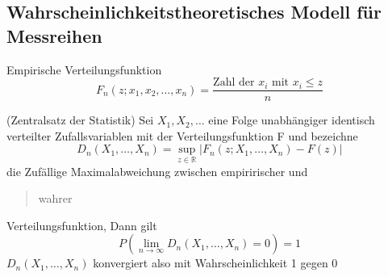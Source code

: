 \documentclass[
	ngerman,
	accentcolor=9c,%
	type=intern,
	marginpar=false
	]{tudapub}
\begin{document}
                \subsection*{Wahrscheinlichkeitstheoretisches Modell für Messreihen}
                Empirische Verteilungsfunktion
                \begin{equation*}
                    F_n(z; x_1,x_2,\dots,x_n) = \dfrac{\text{Zahl der }x_i\text{ mit }x_i\leq z}{n}
                \end{equation*}
                \setcounter{satz}{3}
                \begin{satz}
                    (Zentralsatz der Statistik) Sei $X_1,X_2,\dots$ eine Folge unabhängiger identisch verteilter Zufallsvariablen mit der Verteilungsfunktion F und bezeichne
                    \begin{equation*}
                        D_n(X_1,\dots,X_n) = \sup_{z \in \mathbb{R}} | F_n (z;X_1,\dots,X_n) - F(z)|
                    \end{equation*} 
                    die Zufällige Maximalabweichung zwischen empiririscher und \begin{quote}
                        wahrer
                    \end{quote} Verteilungsfunktion, Dann gilt
                    \begin{equation*}
                        P (\lim_{n\rightarrow \infty} D_n(X_1,\dots,X_n) = 0) =1
                    \end{equation*}
                    $D_n(X_1,\dots,X_n)$ konvergiert also mit Wahrscheinlichkeit 1 gegen 0
                \end{satz}
\end{document}
